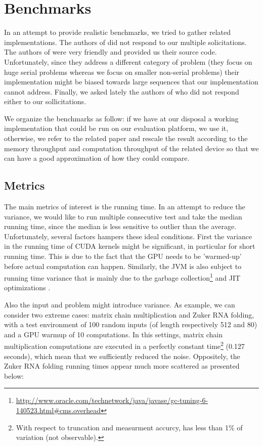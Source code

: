 \section{Benchmarks} \label{benchmarks}
In an attempt to provide realistic benchmarks, we tried to gather related implementations. The authors of \cite{gpu_atlp} did not respond to our multiple solicitations. The authors of \cite{swat_mega} were very friendly and provided us their source code. Unfortunately, since they address a different category of problem (they focus on huge serial problems whereas we focus on smaller non-serial problems) their implementation might be biased towards large sequences that our implementation cannot address. Finally, we asked lately the authors of \cite{gpu_rnafold} who did not respond either to our sollicitations.

We organize the benchmarks as follow: if we have at our disposal a working implementation that could be run on our evaluation platform, we use it, otherwise, we refer to the related paper and rescale the result according to the memory throughput and computation throughput of the related device so that we can have a good approximation of how they could compare.

\subsection{Metrics} \label{metrics}
The main metrics of interest is the running time. In an attempt to reduce the variance, we would like to run multiple consecutive test and take the median running time, since the median is less sensitive to outlier than the average\cite{perfeval}. Unfortunately, several factors hampers these ideal conditions. First the variance in the running time of CUDA kernels might be significant, in particular for short running time. This is due to the fact that the GPU needs to be 'warmed-up' before actual computation can happen. Similarly, the JVM is also subject to running time variance that is mainly due to the garbage collection\footnote{\url{http://www.oracle.com/technetwork/java/javase/gc-tuning-6-140523.html\#cms.overhead}} and JIT optimizations \cite{java_jit}.

Also the input and problem might introduce variance. As example, we can consider two extreme cases: matrix chain multiplication and Zuker RNA folding, with a test environment of 100 random inputs (of length respectively 512 and 80) and a GPU warmup of 10 computations. In this settings, matrix chain multiplication computations are executed in a perfectly constant time\footnote{With respect to truncation and measurment accurcy, has less than 1\% of variation (not observable).} (0.127 seconds), which mean that we sufficiently reduced the noise. Oppositely, the Zuker RNA folding running times appear much more scattered as presented below:

